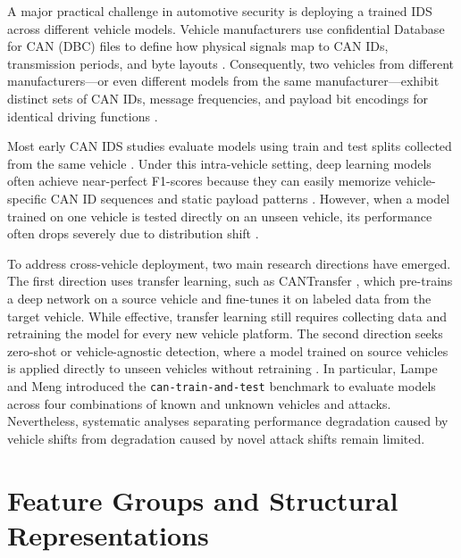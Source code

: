 \documentclass[12pt, a4paper, reqno, oneside]{book}
\begin{document}
A major practical challenge in automotive security is deploying a trained IDS across different vehicle models. Vehicle manufacturers use confidential Database for CAN (DBC) files to define how physical signals map to CAN IDs, transmission periods, and byte layouts \cite{lampe2023cantrain, lampe2024curated}. Consequently, two vehicles from different manufacturers---or even different models from the same manufacturer---exhibit distinct sets of CAN IDs, message frequencies, and payload bit encodings for identical driving functions \cite{lampe2024curated}.

Most early CAN IDS studies evaluate models using train and test splits collected from the same vehicle \cite{song2020invehicle, lee2017otids}. Under this intra-vehicle setting, deep learning models often achieve near-perfect F1-scores because they can easily memorize vehicle-specific CAN ID sequences and static payload patterns \cite{lampe2024curated}. However, when a model trained on one vehicle is tested directly on an unseen vehicle, its performance often drops severely due to distribution shift \cite{lampe2023cantrain, lampe2024curated}.

To address cross-vehicle deployment, two main research directions have emerged. The first direction uses transfer learning, such as CANTransfer \cite{tariq2020cantransfer}, which pre-trains a deep network on a source vehicle and fine-tunes it on labeled data from the target vehicle. While effective, transfer learning still requires collecting data and retraining the model for every new vehicle platform. The second direction seeks zero-shot or vehicle-agnostic detection, where a model trained on source vehicles is applied directly to unseen vehicles without retraining \cite{islam2020graph, lampe2024curated}. In particular, Lampe and Meng introduced the \texttt{can-train-and-test} benchmark \cite{lampe2023cantrain, lampe2024curated} to evaluate models across four combinations of known and unknown vehicles and attacks. Nevertheless, systematic analyses separating performance degradation caused by vehicle shifts from degradation caused by novel attack shifts remain limited.

\section{Feature Groups and Structural Representations}
\label{subsec:feature_structural}
\end{document}
